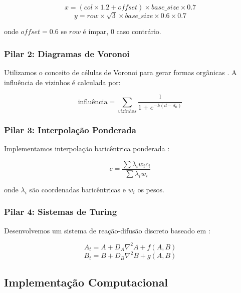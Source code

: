\documentclass[12pt,a4paper,oneside]{extarticle}
\begin{document}
\begin{equation}
x = (col \times 1.2 + offset) \times base\_size \times 0.7
\end{equation}
\begin{equation}
y = row \times \sqrt{3} \times base\_size \times 0.6 \times 0.7
\end{equation}

onde $offset = 0.6$ se $row$ é ímpar, $0$ caso contrário.

\subsubsection{Pilar 2: Diagramas de Voronoi}

Utilizamos o conceito de células de Voronoi para gerar formas orgânicas \cite{mathstackexchange_voronoi_proof_2012}. A influência de vizinhos é calculada por:

\begin{equation}
\text{influência} = \sum_{vizinhos} \frac{1}{1 + e^{-k(d - d_0)}}
\end{equation}

\subsubsection{Pilar 3: Interpolação Ponderada}

Implementamos interpolação baricêntrica ponderada \cite{mathstackexchange_weighted_interpolation_2014}:

\begin{equation}
c = \frac{\sum \lambda_i w_i c_i}{\sum \lambda_i w_i}
\end{equation}

onde $\lambda_i$ são coordenadas baricêntricas e $w_i$ os pesos.

\subsubsection{Pilar 4: Sistemas de Turing}

Desenvolvemos um sistema de reação-difusão discreto baseado em \cite{Kondo2010}:

\begin{equation}
A_t = A + D_A \nabla^2 A + f(A,B)
\end{equation}
\begin{equation}
B_t = B + D_B \nabla^2 B + g(A,B)
\end{equation}

\subsection{Implementação Computacional}
\end{document}
